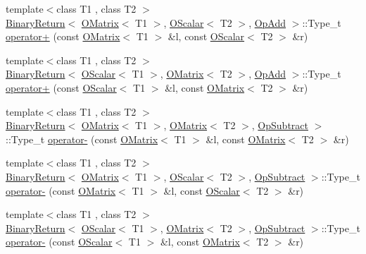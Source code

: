 \begin{DoxyCompactItemize}
\item 
{\footnotesize template$<$class T1 , class T2 $>$ }\\\mbox{\hyperlink{structENSEM_1_1BinaryReturn}{Binary\+Return}}$<$ \mbox{\hyperlink{classENSEM_1_1OMatrix}{O\+Matrix}}$<$ T1 $>$, \mbox{\hyperlink{classENSEM_1_1OScalar}{O\+Scalar}}$<$ T2 $>$, \mbox{\hyperlink{structENSEM_1_1OpAdd}{Op\+Add}} $>$\+::Type\+\_\+t \mbox{\hyperlink{group__obsmatrix_ga594575d5bb0ce31fd07e9fb29fd9c8ac}{operator+}} (const \mbox{\hyperlink{classENSEM_1_1OMatrix}{O\+Matrix}}$<$ T1 $>$ \&l, const \mbox{\hyperlink{classENSEM_1_1OScalar}{O\+Scalar}}$<$ T2 $>$ \&r)
\item 
{\footnotesize template$<$class T1 , class T2 $>$ }\\\mbox{\hyperlink{structENSEM_1_1BinaryReturn}{Binary\+Return}}$<$ \mbox{\hyperlink{classENSEM_1_1OScalar}{O\+Scalar}}$<$ T1 $>$, \mbox{\hyperlink{classENSEM_1_1OMatrix}{O\+Matrix}}$<$ T2 $>$, \mbox{\hyperlink{structENSEM_1_1OpAdd}{Op\+Add}} $>$\+::Type\+\_\+t \mbox{\hyperlink{group__obsmatrix_ga6cdb2a903fbc9f5a836a442a81275a56}{operator+}} (const \mbox{\hyperlink{classENSEM_1_1OScalar}{O\+Scalar}}$<$ T1 $>$ \&l, const \mbox{\hyperlink{classENSEM_1_1OMatrix}{O\+Matrix}}$<$ T2 $>$ \&r)
\item 
{\footnotesize template$<$class T1 , class T2 $>$ }\\\mbox{\hyperlink{structENSEM_1_1BinaryReturn}{Binary\+Return}}$<$ \mbox{\hyperlink{classENSEM_1_1OMatrix}{O\+Matrix}}$<$ T1 $>$, \mbox{\hyperlink{classENSEM_1_1OMatrix}{O\+Matrix}}$<$ T2 $>$, \mbox{\hyperlink{structENSEM_1_1OpSubtract}{Op\+Subtract}} $>$\+::Type\+\_\+t \mbox{\hyperlink{group__obsmatrix_ga71b6bee34df2dbf2b2312b75612fd45f}{operator-\/}} (const \mbox{\hyperlink{classENSEM_1_1OMatrix}{O\+Matrix}}$<$ T1 $>$ \&l, const \mbox{\hyperlink{classENSEM_1_1OMatrix}{O\+Matrix}}$<$ T2 $>$ \&r)
\item 
{\footnotesize template$<$class T1 , class T2 $>$ }\\\mbox{\hyperlink{structENSEM_1_1BinaryReturn}{Binary\+Return}}$<$ \mbox{\hyperlink{classENSEM_1_1OMatrix}{O\+Matrix}}$<$ T1 $>$, \mbox{\hyperlink{classENSEM_1_1OScalar}{O\+Scalar}}$<$ T2 $>$, \mbox{\hyperlink{structENSEM_1_1OpSubtract}{Op\+Subtract}} $>$\+::Type\+\_\+t \mbox{\hyperlink{group__obsmatrix_ga14c923aa4a21485e30dc3ed6f5c0ab46}{operator-\/}} (const \mbox{\hyperlink{classENSEM_1_1OMatrix}{O\+Matrix}}$<$ T1 $>$ \&l, const \mbox{\hyperlink{classENSEM_1_1OScalar}{O\+Scalar}}$<$ T2 $>$ \&r)
\item 
{\footnotesize template$<$class T1 , class T2 $>$ }\\\mbox{\hyperlink{structENSEM_1_1BinaryReturn}{Binary\+Return}}$<$ \mbox{\hyperlink{classENSEM_1_1OScalar}{O\+Scalar}}$<$ T1 $>$, \mbox{\hyperlink{classENSEM_1_1OMatrix}{O\+Matrix}}$<$ T2 $>$, \mbox{\hyperlink{structENSEM_1_1OpSubtract}{Op\+Subtract}} $>$\+::Type\+\_\+t \mbox{\hyperlink{group__obsmatrix_ga57164fdcdeca01384e08724c0cf01504}{operator-\/}} (const \mbox{\hyperlink{classENSEM_1_1OScalar}{O\+Scalar}}$<$ T1 $>$ \&l, const \mbox{\hyperlink{classENSEM_1_1OMatrix}{O\+Matrix}}$<$ T2 $>$ \&r)

\end{DoxyCompactItemize}
